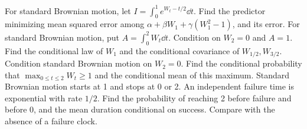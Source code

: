 For standard Brownian motion, let $I=\int_0^1 e^{W_t-t/2}\dd t$. Find the predictor minimizing mean squared error among $\alpha+\beta W_1+\gamma(W_1^2-1)$, and its error.
For standard Brownian motion, put $A=\int_0^2W_t\dd t$. Condition on $W_2=0$ and $A=1$. Find the conditional law of $W_1$ and the conditional covariance of $W_{1/2},W_{3/2}$.
Condition standard Brownian motion on $W_2=0$. Find the conditional probability that $\max_{0\le t\le2}W_t\ge1$ and the conditional mean of this maximum.
Standard Brownian motion starts at 1 and stops at 0 or 2. An independent failure time is exponential with rate $1/2$. Find the probability of reaching 2 before failure and before 0, and the mean duration conditional on success. Compare with the absence of a failure clock.
